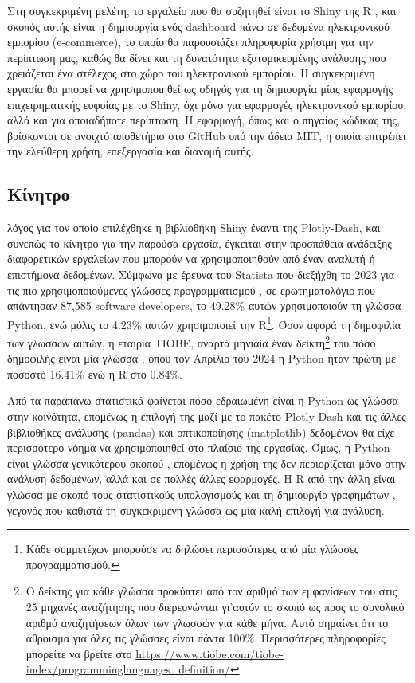 \documentclass[greek, 12pt]{article}
\begin{document}
Στη συγκεκριμένη μελέτη, το εργαλείο που θα συζητηθεί είναι το Shiny της R \cite{chang2024shiny}, και σκοπός αυτής είναι η δημιουργία ενός dashboard πάνω σε δεδομένα ηλεκτρονικού εμπορίου (e-commerce), το οποίο θα παρουσιάζει πληροφορία χρήσιμη για την περίπτωση μας, καθώς θα δίνει και τη δυνατότητα εξατομικευμένης ανάλυσης που χρειάζεται ένα στέλεχος στο χώρο του ηλεκτρονικού εμπορίου. \cite{fedirko2021data} Η συγκεκριμένη εργασία θα μπορεί να χρησιμοποιηθεί ως οδηγός για τη δημιουργία μίας εφαρμογής επιχειρηματικής ευφυίας με το Shiny, όχι μόνο για εφαρμογές ηλεκτρονικού εμπορίου, αλλά και για οποιαδήποτε περίπτωση. Η εφαρμογή, όπως και ο πηγαίος κώδικας της, βρίσκονται σε ανοιχτό αποθετήριο στο GitHub υπό την άδεια MIT, η οποία επιτρέπει την ελεύθερη χρήση, επεξεργασία και διανομή αυτής.


\subsection{Κίνητρο}

 λόγος για τον οποίο επιλέχθηκε η βιβλιοθήκη Shiny έναντι της Plotly-Dash, και συνεπώς το κίνητρο για την παρούσα εργασία, έγκειται στην προσπάθεια ανάδειξης διαφορετικών εργαλείων που μπορούν να χρησιμοποιηθούν από έναν αναλυτή ή επιστήμονα δεδομένων. Σύμφωνα με έρευνα του Statista που διεξήχθη το 2023 για τις πιο χρησιμοποιούμενες γλώσσες προγραμματισμού \cite{Vailshery_2024}, σε ερωτηματολόγιο που απάντησαν 87,585 software developers, το 49.28\% αυτών χρησιμοποιούν τη γλώσσα Python, ενώ μόλις το 4.23\% αυτών χρησιμοποιεί την R\footnote{Κάθε συμμετέχων μπορούσε να δηλώσει περισσότερες από μία γλώσσες προγραμματισμού.}. Όσον αφορά τη δημοφιλία των γλωσσών αυτών, η εταιρία TIOBE, αναρτά μηνιαία έναν δείκτη\footnote{Ο δείκτης για κάθε γλώσσα προκύπτει από τον αριθμό των εμφανίσεων του στις 25 μηχανές αναζήτησης που διερευνώνται γι’αυτόν το σκοπό ως προς το συνολικό αριθμό αναζητήσεων όλων των γλωσσών για κάθε μήνα. Αυτό σημαίνει ότι το άθροισμα για όλες τις γλώσσες είναι πάντα 100\%. Περισσότερες πληροφορίες μπορείτε να βρείτε στο \url{https://www.tiobe.com/tiobe-index/programminglanguages_definition/}} του πόσο δημοφιλής είναι μία γλώσσα \cite{TIOBE_2022}, όπου τον Απρίλιο του 2024 η Python ήταν πρώτη με ποσοστό 16.41\% ενώ η R στο 0.84\%. 

Από τα παραπάνω στατιστικά φαίνεται πόσο εδραιωμένη είναι η Python ως γλώσσα στην κοινότητα, επομένως η επιλογή της μαζί με το πακέτο Plotly-Dash και τις άλλες βιβλιοθήκες ανάλυσης (pandas) και οπτικοποίησης (matplotlib) δεδομένων θα είχε περισσότερο νόημα να χρησιμοποιηθεί στο πλαίσιο της εργασίας. Όμως, η Python είναι γλώσσα γενικότερου σκοπού \cite{Wikipedia_2024}, επομένως η χρήση της δεν περιορίζεται μόνο στην ανάλυση δεδομένων, αλλά και σε πολλές άλλες εφαρμογές. Η R από την άλλη είναι γλώσσα με σκοπό τους στατιστικούς υπολογισμούς και τη δημιουργία γραφημάτων \cite{Rprogramminglanguage}, γεγονός που καθιστά τη συγκεκριμένη γλώσσα ως μία καλή επιλογή για ανάλυση.
\end{document}
